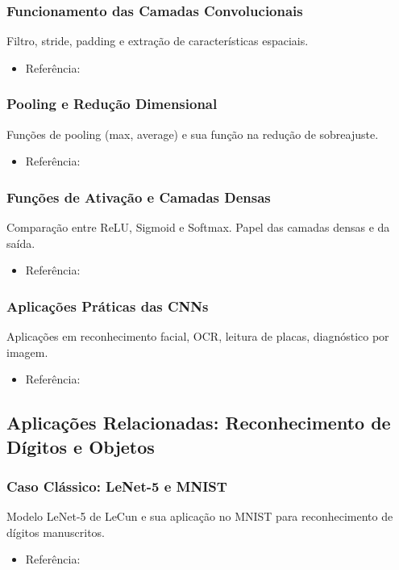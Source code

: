 \subsubsection{Funcionamento das Camadas Convolucionais}
Filtro, stride, padding e extração de características espaciais.
\begin{itemize}
    \item Referência: \cite{lecun1998gradient, datacamp_cnn}
\end{itemize}

\subsubsection{Pooling e Redução Dimensional}
Funções de pooling (max, average) e sua função na redução de sobreajuste.
\begin{itemize}
    \item Referência: \cite{datacamp_cnn}
\end{itemize}

\subsubsection{Funções de Ativação e Camadas Densas}
Comparação entre ReLU, Sigmoid e Softmax. Papel das camadas densas e da saída.
\begin{itemize}
    \item Referência: \cite{goodfellow2016deep}
\end{itemize}

\subsubsection{Aplicações Práticas das CNNs}
Aplicações em reconhecimento facial, OCR, leitura de placas, diagnóstico por imagem.
\begin{itemize}
    \item Referência: \cite{goodfellow2016deep, lecun1998gradient}
\end{itemize}

\subsection{Aplicações Relacionadas: Reconhecimento de Dígitos e Objetos}

\subsubsection{Caso Clássico: LeNet-5 e MNIST}
Modelo LeNet-5 de LeCun e sua aplicação no MNIST para reconhecimento de dígitos manuscritos.
\begin{itemize}
    \item Referência: \cite{lecun1998gradient}
\end{itemize}

